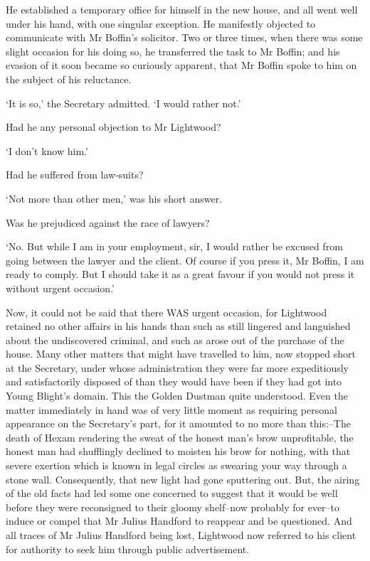 He established a temporary office for himself in the new house, and all
went well under his hand, with one singular exception. He manifestly
objected to communicate with Mr Boffin’s solicitor. Two or three times,
when there was some slight occasion for his doing so, he transferred
the task to Mr Boffin; and his evasion of it soon became so curiously
apparent, that Mr Boffin spoke to him on the subject of his reluctance.

‘It is so,’ the Secretary admitted. ‘I would rather not.’

Had he any personal objection to Mr Lightwood?

‘I don’t know him.’

Had he suffered from law-suits?

‘Not more than other men,’ was his short answer.

Was he prejudiced against the race of lawyers?

‘No. But while I am in your employment, sir, I would rather be excused
from going between the lawyer and the client. Of course if you press it,
Mr Boffin, I am ready to comply. But I should take it as a great favour
if you would not press it without urgent occasion.’

Now, it could not be said that there WAS urgent occasion, for Lightwood
retained no other affairs in his hands than such as still lingered and
languished about the undiscovered criminal, and such as arose out of the
purchase of the house. Many other matters that might have travelled to
him, now stopped short at the Secretary, under whose administration they
were far more expeditiously and satisfactorily disposed of than they
would have been if they had got into Young Blight’s domain. This the
Golden Dustman quite understood. Even the matter immediately in hand
was of very little moment as requiring personal appearance on the
Secretary’s part, for it amounted to no more than this:--The death of
Hexam rendering the sweat of the honest man’s brow unprofitable, the
honest man had shufflingly declined to moisten his brow for nothing,
with that severe exertion which is known in legal circles as swearing
your way through a stone wall. Consequently, that new light had gone
sputtering out. But, the airing of the old facts had led some one
concerned to suggest that it would be well before they were reconsigned
to their gloomy shelf--now probably for ever--to induce or compel that
Mr Julius Handford to reappear and be questioned. And all traces of Mr
Julius Handford being lost, Lightwood now referred to his client for
authority to seek him through public advertisement.


